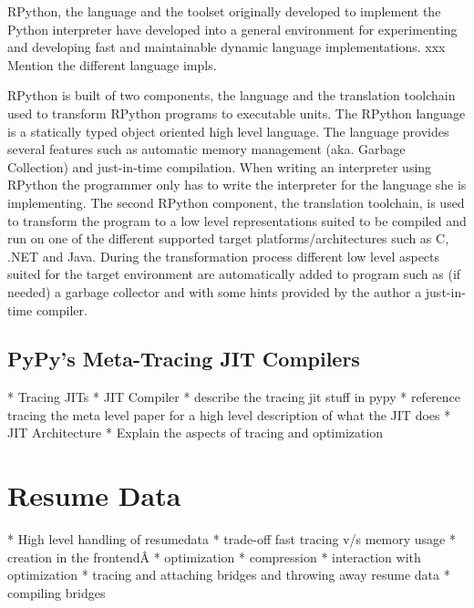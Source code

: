 \documentclass[10pt]{sigplanconf}
\begin{document}
RPython, the language and the toolset originally developed to implement the
Python interpreter have developed into a general environment for experimenting
and developing fast and maintainable dynamic language implementations. xxx Mention
the different language impls.

RPython is built of two components, the language and the translation toolchain
used to transform RPython programs to executable units.  The RPython language
is a statically typed object oriented high level language. The language provides
several features such as automatic memory management (aka. Garbage Collection)
and just-in-time compilation. When writing an interpreter using RPython the
programmer only has to write the interpreter for the language she is
implementing.  The second RPython component, the translation toolchain, is used
to transform the program to a low level representations suited to be compiled
and run on one of the different supported target platforms/architectures such
as C, .NET and Java. During the transformation process
different low level aspects suited for the target environment are automatically
added to program such as (if needed) a garbage collector and with some hints
provided by the author a just-in-time compiler.



\subsection{PyPy's Meta-Tracing JIT Compilers}
\label{sub:tracing}

 * Tracing JITs
 * JIT Compiler
   * describe the tracing jit stuff in pypy
   * reference tracing the meta level paper for a high level description of what the JIT does
   * JIT Architecture
   * Explain the aspects of tracing and optimization



\section{Resume Data}
\label{sec:Resume Data}

* High level handling of resumedata
   * trade-off fast tracing v/s memory usage
   * creation in the frontendÂ
   * optimization
   * compression
   * interaction with optimization
   * tracing and attaching bridges and throwing away resume data
   * compiling bridges

\end{document}
